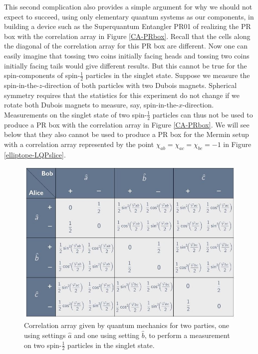 This second complication also provides a simple argument for why we should not expect to succeed, using only elementary quantum systems as our components, in building a device such as the Superquantum Entangler PR01 of \citet{Bub and Bub 2018} realizing the PR box with the correlation array in Figure \ref{CA-PRbox}. Recall that the cells along the diagonal of the correlation array for this PR box are different. Now one can easily imagine that tossing two coins initially facing heads and tossing two coins initially facing tails would give different results. But this cannot be true for the spin-components of spin-$\frac12$ particles in the singlet state. Suppose we measure the spin-in-the-$z$-direction of both particles with two Dubois magnets. Spherical symmetry requires that the statistics for this experiment do not change if we rotate both Dubois magnets to measure, say, spin-in-the-$x$-direction. Measurements on the singlet state of two spin-$\frac12$ particles can thus not be used to produce a PR box with the correlation array in Figure \ref{CA-PRbox}. We will see below that they also cannot be used to produce a PR box for the Mermin setup with a correlation array represented by the point $\chi_{ab} = \chi_{ac} = \chi_{bc} = -1$ in Figure \ref{elliptope-LQPslice}.

\begin{figure}[ht]
 \centering
   \includegraphics[width=4.5in]{CA-3set2out-non-signaling-halfangles.jpeg} 
   \caption{Correlation array given by quantum mechanics for two parties, one using settings $\hat{a}$ and one using setting $\hat{b}$, to perform a measurement on two spin-$\frac12$ particles in the singlet state.}
   \label{CA-3set2out-non-signaling-halfangles}
\end{figure}

